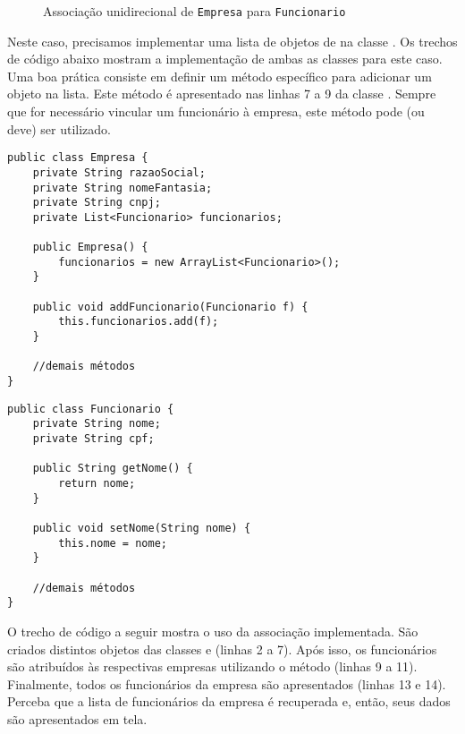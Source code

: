 \begin{figure}[h]
	\centering
	
	
	\caption{Associação unidirecional de \texttt{Empresa} para \texttt{Funcionario}}
	\label{fig:associacao-muitos-uni-empresa}
\end{figure}

Neste caso, precisamos implementar uma lista de objetos de  na classe . Os trechos de código abaixo mostram a implementação de ambas as classes para este caso. Uma boa prática consiste em definir um método específico para adicionar um objeto na lista. Este método é apresentado nas linhas 7 a 9 da classe . Sempre que for necessário vincular um funcionário à empresa, este método pode (ou deve) ser utilizado.

\begin{verbatim}
public class Empresa {
	private String razaoSocial;
	private String nomeFantasia;
	private String cnpj;
	private List<Funcionario> funcionarios;

	public Empresa() {
		funcionarios = new ArrayList<Funcionario>();
	}

	public void addFuncionario(Funcionario f) {
		this.funcionarios.add(f);
	}
	
	//demais métodos
}
\end{verbatim}

\begin{verbatim}
public class Funcionario {
	private String nome;
	private String cpf;

	public String getNome() {
		return nome;
	}

	public void setNome(String nome) {
		this.nome = nome;
	}
	
	//demais métodos
}
\end{verbatim}

O trecho de código a seguir mostra o uso da associação implementada. São criados distintos objetos das classes  e  (linhas 2 a 7). Após isso, os funcionários são atribuídos às respectivas empresas utilizando o método  (linhas 9 a 11). Finalmente, todos os funcionários da empresa  são apresentados (linhas 13 e 14). Perceba que a lista de funcionários da empresa  é recuperada e, então, seus dados são apresentados em tela.

